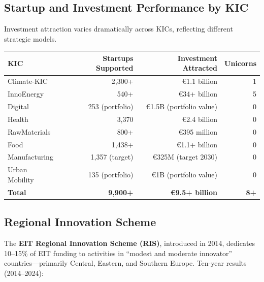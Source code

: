 \documentclass[../main.tex]{subfiles}
\begin{document}
\subsection*{Startup and Investment Performance by KIC}

Investment attraction varies dramatically across KICs, reflecting different strategic models.

\tableminimal
\begin{center}
\begin{tabular}{@{}lrrr@{}}
\toprule
\textbf{KIC} & \textbf{Startups Supported} & \textbf{Investment Attracted} & \textbf{Unicorns} \\
\midrule
Climate-KIC & 2,300+ & €1.1 billion & 1 \\
InnoEnergy & 540+ & €34+ billion & 5 \\
Digital & 253 (portfolio) & €1.5B (portfolio value) & 0 \\
Health & 3,370 & €2.4 billion & 0 \\
RawMaterials & 800+ & €395 million & 0 \\
Food & 1,438+ & €1.1+ billion & 0 \\
Manufacturing & 1,357 (target) & €325M (target 2030) & 0 \\
Urban Mobility & 135 (portfolio) & €1B (portfolio value) & 0 \\
\midrule
\textbf{Total} & \textbf{9,900+} & \textbf{€9.5+ billion} & \textbf{8+} \\
\bottomrule
\end{tabular}
\end{center}

\subsection*{Regional Innovation Scheme}

The \textbf{EIT Regional Innovation Scheme (RIS)}, introduced in 2014, dedicates 10--15\% of EIT funding to activities in ``modest and moderate innovator'' countries---primarily Central, Eastern, and Southern Europe. Ten-year results (2014--2024):
\end{document}
